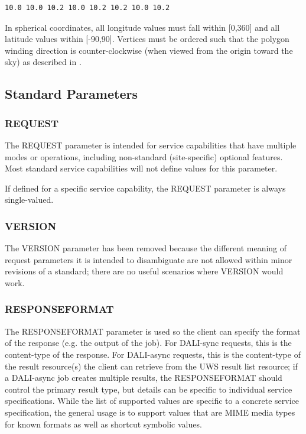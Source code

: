 \documentclass[11pt,letter]{ivoa}
\begin{document}
\begin{verbatim}
10.0 10.0 10.2 10.0 10.2 10.2 10.0 10.2
\end{verbatim}

In spherical coordinates, all longitude values must fall within [0,360] and all 
latitude values within [-90,90]. Vertices must be ordered such that the polygon 
winding direction is counter-clockwise (when viewed from the origin toward the 
sky) as described in \citep{std:STC}.


\subsection{Standard Parameters}

\subsubsection{REQUEST}
\label{sec:REQUEST}
The REQUEST parameter is intended for service capabilities that have 
multiple modes or operations, including non-standard (site-specific) optional 
features. Most standard service capabilities will not define values for this 
parameter.

If defined for a specific service capability, the REQUEST parameter is always 
single-valued.

\subsubsection{VERSION}
\label{sec:VERSION}
The VERSION parameter has been removed because the different 
meaning of request 
parameters it is intended to disambiguate are not allowed within minor 
revisions of a standard; there are no useful scenarios where VERSION would work.

\subsubsection{RESPONSEFORMAT}
\label{sec:RESPONSEFORMAT}
The RESPONSEFORMAT parameter is used so the client can specify the format of the 
response (e.g. the output of the job). For DALI-sync requests, this is the 
content-type of the response. For DALI-async requests, this is the content-type 
of the result resource(s) the client can retrieve from the UWS result list 
resource; if a DALI-async job creates multiple results, the RESPONSEFORMAT 
should control the primary result type, but details can be specific to 
individual service specifications. While the list of supported values are 
specific to a concrete service specification, the general usage is to support 
values that are MIME media types \citep{std:MIME} for known 
formats as well as 
shortcut symbolic values. 
\end{document}
